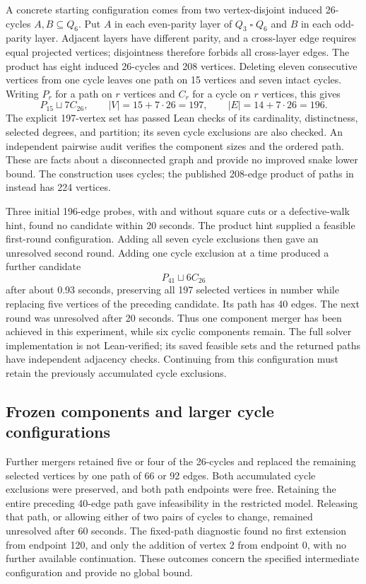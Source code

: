 \documentclass[11pt,a4paper]{article}
\theoremstyle{definition}
\theoremstyle{remark}
\newcommand{\Q}{Q}
\begin{document}
A concrete starting configuration comes from two vertex-disjoint induced 26-cycles $A,B\subseteq\Q_6$. Put $A$ in each even-parity layer of $\Q_3\mathbin{\square}\Q_6$ and $B$ in each odd-parity layer. Adjacent layers have different parity, and a cross-layer edge requires equal projected vertices; disjointness therefore forbids all cross-layer edges. The product has eight induced 26-cycles and 208 vertices. Deleting eleven consecutive vertices from one cycle leaves one path on 15 vertices and seven intact cycles. Writing $P_r$ for a path on $r$ vertices and $C_r$ for a cycle on $r$ vertices, this gives
\[
P_{15}\sqcup 7C_{26},\qquad
|V|=15+7\cdot26=197,\qquad |E|=14+7\cdot26=196.
\]
The explicit 197-vertex set has passed Lean checks of its cardinality, distinctness, selected degrees, and partition; its seven cycle exclusions are also checked. An independent pairwise audit verifies the component sizes and the ordered path. These are facts about a disconnected graph and provide no improved snake lower bound. The construction uses cycles; the published 208-edge product of paths in \cite{orland} instead has 224 vertices.

Three initial 196-edge probes, with and without square cuts or a defective-walk hint, found no candidate within 20 seconds. The product hint supplied a feasible first-round configuration. Adding all seven cycle exclusions then gave an unresolved second round. Adding one cycle exclusion at a time produced a further candidate
\[
P_{41}\sqcup 6C_{26}
\]
after about 0.93 seconds, preserving all 197 selected vertices in number while replacing five vertices of the preceding candidate. Its path has 40 edges. The next round was unresolved after 20 seconds. Thus one component merger has been achieved in this experiment, while six cyclic components remain. The full solver implementation is not Lean-verified; its saved feasible sets and the returned paths have independent adjacency checks. Continuing from this configuration must retain the previously accumulated cycle exclusions.

\subsection{Frozen components and larger cycle configurations}
Further mergers retained five or four of the 26-cycles and replaced the remaining selected vertices by one path of 66 or 92 edges. Both accumulated cycle exclusions were preserved, and both path endpoints were free. Retaining the entire preceding 40-edge path gave infeasibility in the restricted model. Releasing that path, or allowing either of two pairs of cycles to change, remained unresolved after 60 seconds. The fixed-path diagnostic found no first extension from endpoint 120, and only the addition of vertex 2 from endpoint 0, with no further available continuation. These outcomes concern the specified intermediate configuration and provide no global bound.
\end{document}
